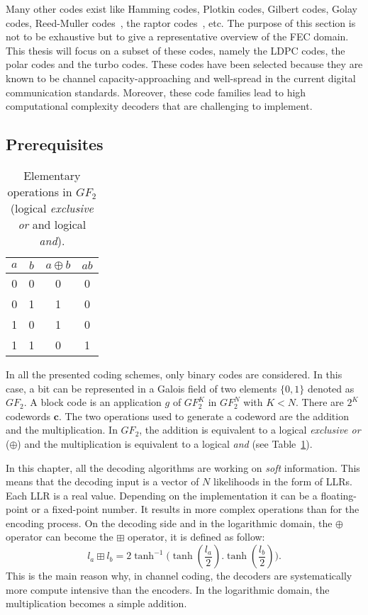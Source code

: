 Many other codes exist like Hamming codes, Plotkin codes, Gilbert codes, Golay
codes, Reed-Muller codes~\cite{Muller1954,Reed1954}, the raptor
codes~\cite{Shokrollahi2004}, etc. The purpose of this section is not to be
exhaustive but to give a representative overview of the FEC domain. This thesis
will focus on a subset of these codes, namely the LDPC codes, the polar codes
and the turbo codes. These codes have been selected because they are known to
be channel capacity-approaching and well-spread in the current digital
communication standards. Moreover, these code families lead to high
computational complexity decoders that are challenging to implement.

\subsection{Prerequisites}

\begin{table}[htp]
  \centering
  \caption{Elementary operations in $GF_2$ (logical \emph{exclusive or} and
    logical \emph{and}).}
  \label{tab:ctx_gf2_operations}
  \begin{tabular}{c c c c}
  \toprule
  $a$ & $b$ & $a \oplus b$ & $ab$ \\
  \midrule
  0 & 0 & 0 & 0 \\
  0 & 1 & 1 & 0 \\
  1 & 0 & 1 & 0 \\
  1 & 1 & 0 & 1 \\
  \bottomrule
  \end{tabular}
\end{table}

In all the presented coding schemes, only binary codes are considered. In this
case, a bit can be represented in a Galois field of two elements $\{0, 1\}$
denoted as $GF_2$. A block code is an application $g$ of $GF_2^K$ in $GF_2^N$
with $K < N$. There are $2^K$ codewords $\bm{c}$. The two operations used to
generate a codeword are the addition and the multiplication. In $GF_2$, the
addition is equivalent to a logical \emph{exclusive or} ($\oplus$) and
the multiplication is equivalent to a logical \emph{and} (see
Table~\ref{tab:ctx_gf2_operations}).

In this chapter, all the decoding algorithms are working on \emph{soft}
information. This means that the decoding input is a vector of $N$ likelihoods
in the form of LLRs. Each LLR is a real value. Depending on the implementation
it can be a floating-point or a fixed-point number. It results in more complex
operations than for the encoding process. On the decoding side and in the
logarithmic domain, the $\oplus$ operator can become the $\boxplus$ operator, it
is defined as follow:
\begin{equation}
  l_a \boxplus l_b = 2\tanh^{-1}{\big(\tanh{(\frac{l_a}{2}).\tanh{(\frac{l_b}{2})}}\big)}.
\end{equation}
This is the main reason why, in channel coding, the decoders are systematically
more compute intensive than the encoders. In the logarithmic domain, the
multiplication becomes a simple addition.

